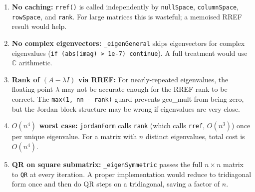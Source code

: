 \documentclass[12pt, a4paper]{article}
\newcommand{\code}[1]{\texttt{\small#1}}
\newcommand{\fn}[1]{\texttt{\small\color{funcgreen}#1}}
\begin{document}
\begin{enumerate}[noitemsep]
  \item \textbf{No caching:} \fn{rref()} is called independently by
        \fn{nullSpace}, \fn{columnSpace}, \fn{rowSpace}, and \fn{rank}.
        For large matrices this is wasteful; a memoised RREF result would
        help.
  \item \textbf{No complex eigenvectors:} \fn{\_eigenGeneral} skips
        eigenvectors for complex eigenvalues (\code{if (abs(imag) > 1e-7)
        continue}).  A full treatment would use $\mathbb{C}$ arithmetic.
  \item \textbf{Rank of $(A - \lambda I)$ via RREF:}  For nearly-repeated
        eigenvalues, the floating-point $\lambda$ may not be accurate enough
        for the RREF rank to be correct.  The \code{max(1, nn - rank)} guard
        prevents geo\_mult from being zero, but the Jordan block structure may
        be wrong if eigenvalues are very close.
  \item \textbf{$O(n^4)$ worst case:}  \fn{jordanForm} calls \fn{rank}
        (which calls \fn{rref}, $O(n^3)$) once per unique eigenvalue.  For
        a matrix with $n$ distinct eigenvalues, total cost is $O(n^4)$.
  \item \textbf{QR on square submatrix:}  \fn{\_eigenSymmetric} passes the
        full $n \times n$ matrix to \fn{QR} at every iteration.
        A proper implementation would reduce to tridiagonal form once and
        then do QR steps on a tridiagonal, saving a factor of $n$.
\end{enumerate}
\end{document}
